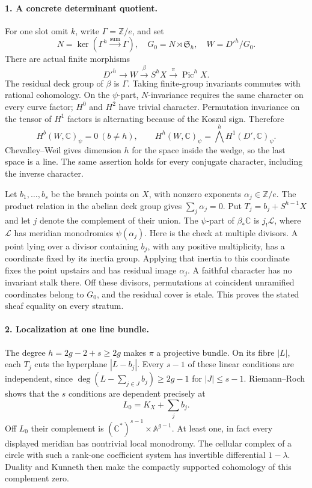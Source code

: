 \paragraph{1. A concrete determinant quotient.}
For one slot omit $k$, write $\Gamma=\mathbb Z/e$, and set
\[
 N=\ker(\Gamma^h\xrightarrow{\mathrm{sum}}\Gamma),\quad
 G_0=N\rtimes\mathfrak S_h,\quad W=D'^h/G_0.
\]
There are actual finite morphisms
\[
 D'^h\longrightarrow W\xrightarrow{\beta}S^hX
              \xrightarrow{\pi}\operatorname{Pic}^hX.
\]
The residual deck group of $\beta$ is $\Gamma$. Taking finite-group
invariants commutes with rational cohomology. On the $\psi$-part,
$N$-invariance requires the same character on every curve factor;
$H^0$ and $H^2$ have trivial character. Permutation invariance on
the tensor of $H^1$ factors is alternating because of the Koszul
sign. Therefore
\[
 H^b(W,\mathbb C)_\psi=0\ (b\ne h),\qquad
 H^h(W,\mathbb C)_\psi
       =\bigwedge^hH^1(D',\mathbb C)_\psi.
                                                        \tag{R01.3}
\]
Chevalley--Weil gives dimension $h$ for the space inside the wedge,
so the last space is a line. The same assertion holds for every
conjugate character, including the inverse character.

Let $b_1,\ldots,b_s$ be the branch points on $X$, with nonzero
exponents $\alpha_j\in\mathbb Z/e$. The product relation in the
abelian deck group gives $\sum_j\alpha_j=0$. Put
$T_j=b_j+S^{h-1}X$ and let $j$ denote the complement of their union.
The $\psi$-part of $\beta_*\mathbb C$ is $j_!\mathcal L$, where
$\mathcal L$ has meridian monodromies $\psi(\alpha_j)$.
Here is the check at multiple divisors. A point lying over a divisor
containing $b_j$, with any positive multiplicity, has a coordinate
fixed by its inertia group. Applying that inertia to this coordinate
fixes the point upstairs and has residual image $\alpha_j$. A faithful
character has no invariant stalk there. Off these divisors, permutations
at coincident unramified coordinates belong to $G_0$, and the residual
cover is etale. This proves the stated sheaf equality on every stratum.

\paragraph{2. Localization at one line bundle.}
The degree $h=2g-2+s\ge2g$ makes $\pi$ a projective bundle. On its
fibre $|L|$, each $T_j$ cuts the hyperplane $|L-b_j|$. Every $s-1$
of these linear conditions are independent, since
$\deg(L-\sum_{j\in J}b_j)\ge2g-1$ for $|J|\le s-1$.
Riemann--Roch shows that the $s$ conditions are dependent precisely
at
\[
                 L_0=K_X+\sum_jb_j.
\]
Off $L_0$ their complement is
$(\mathbb C^*)^{s-1}\times\mathbb A^{g-1}$.
At least one, in fact every displayed meridian has nontrivial
local monodromy. The cellular complex of a circle with such a
rank-one coefficient system has invertible differential $1-\lambda$.
Duality and Kunneth then make the compactly supported cohomology
of this complement zero.

